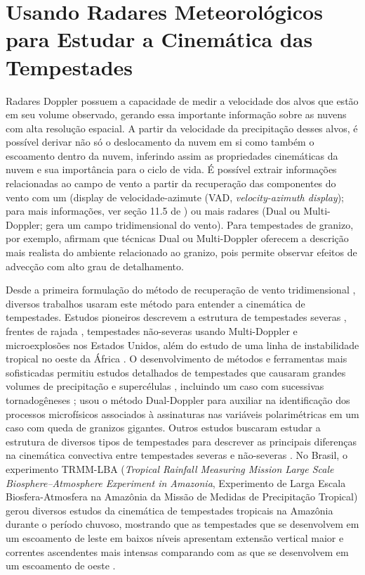 \section{Usando Radares Meteorológicos para Estudar a Cinemática das Tempestades}

Radares Doppler possuem a capacidade de medir a velocidade dos alvos que estão em seu volume observado, gerando essa importante informação sobre as nuvens com alta resolução espacial. A partir da velocidade da precipitação desses alvos, é possível derivar não só o deslocamento da nuvem em si como também o escoamento dentro da nuvem, inferindo assim as propriedades cinemáticas da nuvem e sua importância para o ciclo de vida. É possível extrair informações relacionadas ao campo de vento a partir da recuperação das componentes do vento com um  (display de velocidade-azimute (VAD, \textit{velocity-azimuth display}); para mais informações, ver seção 11.5 de ) ou mais radares (Dual ou Multi-Doppler; gera um campo tridimensional do vento). Para tempestades de granizo, por exemplo,  afirmam que técnicas Dual ou Multi-Doppler oferecem a descrição mais realista do ambiente relacionado ao granizo, pois permite observar efeitos de advecção com alto grau de detalhamento.

Desde a primeira formulação do método de recuperação de vento tridimensional \cite{Armijo1969}, diversos trabalhos usaram este método para entender a cinemática de tempestades. Estudos pioneiros descrevem a estrutura de tempestades severas \cite{Brandes1977, Ray1980}, frentes de rajada \cite{Weaver1982}, tempestades não-severas usando Multi-Doppler \cite{Ray1978} e microexplosões \cite{Wilson1984} nos Estados Unidos, além do estudo de uma linha de instabilidade tropical no oeste da África \cite{Chong1987}. O desenvolvimento de métodos e ferramentas mais sofisticadas permitiu estudos detalhados de tempestades que causaram grandes volumes de precipitação \cite{Petersen1999a, Calhoun2013} e supercélulas \cite{Potvin2012a, Potvin2012b}, incluindo um caso com sucessivas tornadogêneses \cite{Wurman2007};  usou o método Dual-Doppler para auxiliar na identificação dos processos microfísicos associados à assinaturas nas variáveis polarimétricas em um caso com queda de granizos gigantes. Outros estudos buscaram estudar a estrutura de diversos tipos de tempestades para descrever as principais diferenças na cinemática convectiva entre tempestades severas e não-severas \cite{Lang2002, Deierling2008}. No Brasil, o experimento TRMM-LBA (\textit{Tropical Rainfall Measuring Mission Large Scale Biosphere–Atmosphere Experiment in Amazonia}, Experimento de Larga Escala Biosfera-Atmosfera na Amazônia da Missão de Medidas de Precipitação Tropical) gerou diversos estudos da cinemática de tempestades tropicais na Amazônia durante o período chuvoso, mostrando que as tempestades que se desenvolvem em um escoamento de leste em baixos níveis apresentam extensão vertical maior e correntes ascendentes mais intensas comparando com as que se desenvolvem em um escoamento de oeste \cite{Rutledge2000, Cifelli2002b, Cifelli2004a}.

